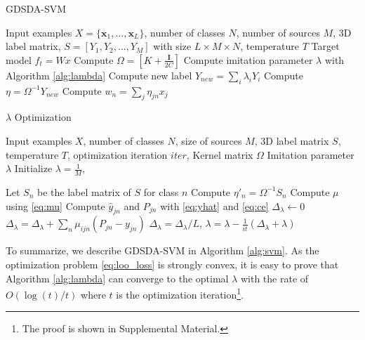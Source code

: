 \begin{algorithm}[t]
	\caption{GDSDA-SVM}\label{alg:svm}
	\begin{algorithmic}
		\Require Input examples $X=\{\textbf{x}_1,...,\textbf{x}_L\}$, number of classes $N$, number of sources $M$, 3D label matrix, $S=[Y_1,Y_2,...,Y_{M}]$ with size $L\times M \times N$, temperature $T$ %
		\Ensure Target model $f_t = Wx$
		\State Compute $\Omega=[K+\frac{\mathbf{I}}{2C}]$
		\State Compute imitation parameter $\lambda$ with Algorithm \ref{alg:lambda}
		\State Compute new label $Y_{new}=\sum_i\lambda_iY_i$
		\State Compute $\eta = \Omega^{-1}Y_{new}$
		\State Compute $w_n = \sum_j \eta_{jn}x_j$
	\end{algorithmic}	
\end{algorithm}
\begin{algorithm}
	\caption{$\lambda$ Optimization}\label{alg:lambda}
\begin{algorithmic}
	\Require Input examples $X$, number of classes $N$, size of sources $M$, 3D label matrix $S$, temperature $T$, optimization iteration $iter$, Kernel matrix $\Omega$
    \Ensure Imitation parameter $\lambda$
    \State Initialize $\lambda = \frac{1}{M}$, 
    
    \State Let $S_n$ be the label matrix of $S$ for class $n$
    \State Compute $\eta'_n=\Omega^{-1}S_n$ 
    \EndFor
    \State Compute $\mu$ using \eqref{eq:mu}
	    \State Compute $\hat{y}_{jn}$ and $P_{jn}$ with \eqref{eq:yhat}  and \eqref{eq:ce}
	    \State $\Delta_{\lambda} \leftarrow 0$
	    \For {each $\textbf{x}_j$ in $X$}
		    \State $\Delta_{\lambda} = \Delta_{\lambda}+\sum_n\mu_{ijn}\left(P_{jn}-{y}_{jn}\right)$
	    \EndFor
	    \State $\Delta_{\lambda} =\Delta_{\lambda}/L$, $\lambda = \lambda - \frac{1}{it}(\Delta_{\lambda}+\lambda)$
    \EndFor
\end{algorithmic}	
\end{algorithm}
To summarize, we describe GDSDA-SVM in Algorithm \ref{alg:svm}. As the optimization problem \eqref{eq:loo_loss} is strongly convex, it is easy to prove that Algorithm \ref{alg:lambda} can converge to the optimal $\lambda$ with the rate of $O(\log(t)/t)$ where $t$ is the optimization iteration\footnote{The proof is shown in Supplemental Material.}. 




